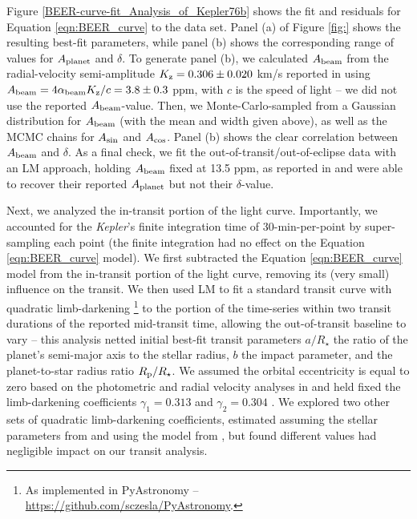 \documentclass[manuscript]{aastex62}
\newcommand{\kepler}{{\it Kepler}}
\begin{document}
Figure \ref{BEER-curve-fit_Analysis_of_Kepler76b} shows the fit and residuals for Equation \ref{eqn:BEER_curve} to the data set. Panel (a) of Figure \ref{fig:} shows the resulting best-fit parameters, while panel (b) shows the corresponding range of values for $A_{\rm planet}$ and $\delta$. To generate panel (b), we calculated $A_{\rm beam}$ from the radial-velocity semi-amplitude $K_{\rm z} = 0.306 \pm 0.020$ km/s reported in \citet{2013ApJ...771...26F} using $A_{\rm beam} = 4 \alpha_{\rm beam} K_{\rm z}/c = 3.8 \pm 0.3$ ppm, with $c$ is the speed of light \citep{2003ApJ...588L.117L} -- we did not use the reported $A_{\rm beam}$-value. Then, we Monte-Carlo-sampled from a Gaussian distribution for $A_{\rm beam}$ (with the mean and width given above), as well as the MCMC chains for $A_{\rm sin}$ and $A_{\rm cos}$. Panel (b) shows the clear correlation between $A_{\rm beam}$ and $\delta$. As a final check, we fit the out-of-transit/out-of-eclipse data with an LM approach, holding $A_{\rm beam}$ fixed at 13.5 ppm, as reported in \citet{2013ApJ...771...26F} and were able to recover their reported $A_{\rm planet}$ but not their $\delta$-value.

Next, we analyzed the in-transit portion of the light curve. Importantly, we accounted for the \kepler's finite integration time of 30-min-per-point by super-sampling each point (the finite integration had no effect on the Equation \ref{eqn:BEER_curve} model). We first subtracted the Equation \ref{eqn:BEER_curve} model from the in-transit portion of the light curve, removing its (very small) influence on the transit. We then used LM to fit a standard transit curve with quadratic limb-darkening \citep{2002ApJ...580L.171M}\footnote{As implemented in PyAstronomy -- \url{https://github.com/sczesla/PyAstronomy}.} to the portion of the time-series within two transit durations of the reported mid-transit time, allowing the out-of-transit baseline to vary -- this analysis netted initial best-fit transit parameters $a/R_\star$ the ratio of the planet's semi-major axis to the stellar radius, $b$ the impact parameter, and the planet-to-star radius ratio $R_{\rm p}/R_\star$. We assumed the orbital eccentricity is equal to zero based on the photometric and radial velocity analyses in \citet{2013ApJ...771...26F} and held fixed the limb-darkening coefficients $\gamma_1 = 0.313$ and $\gamma_2 = 0.304$  \citep{2013ApJ...771...26F}. We explored two other sets of quadratic limb-darkening coefficients, estimated assuming the stellar parameters from \citet{2013ApJ...771...26F} and using the model from \citet{2015MNRAS.450.1879E}, but found different values had negligible impact on our transit analysis. 
\end{document}

